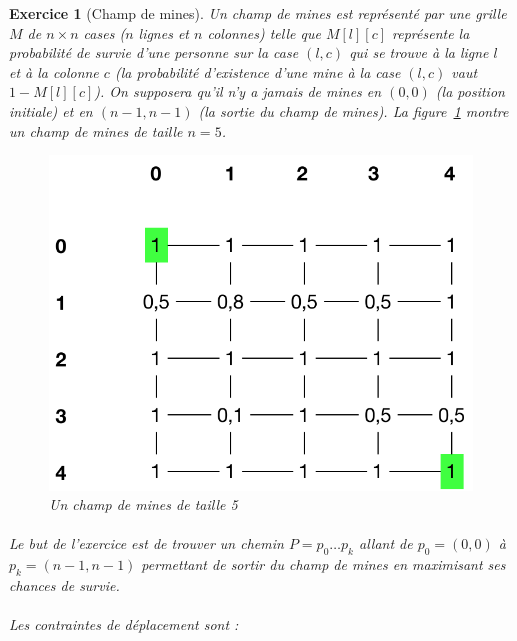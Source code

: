 \documentclass{article}
\theoremstyle{exostyle}
\newtheorem{exo}{Exercice}
\theoremstyle{partiestyle}
\theoremstyle{questionstyle}
\begin{document}
\begin{exo}[Champ de mines]
    Un champ de mines est représenté par une grille $M$ de $n\times n$ cases ($n$ lignes et $n$ colonnes) telle que $M[l][c]$ représente la probabilité de survie 
 d'une personne sur la case $(l, c)$ qui se trouve à la ligne $l$ et à la colonne $c$ (la probabilité d'existence d'une mine à la case $(l, c)$ vaut $1-M[l][c]$). On supposera qu'il n'y a jamais de mines en $(0,0)$ (la position initiale) et en $(n-1, n-1)$ (la sortie du champ de mines). La figure~\ref{champ} montre un champ de mines de taille $n=5$.

    \begin{figure}[h]
        \begin{center}
        \includegraphics[scale=.5]{champ_mines}
        \end{center}
        \caption{Un champ de mines de taille 5\label{champ}}
    \end{figure}
    \paragraph{}Le but de l'exercice est de trouver un chemin $P = p_0\dots p_k$ allant de $p_0 = (0, 0)$ à $p_k = (n-1, n-1)$ permettant de sortir du champ de mines en maximisant ses chances de survie. 

    \paragraph{}Les contraintes de déplacement sont :


\end{exo}
\end{document}
